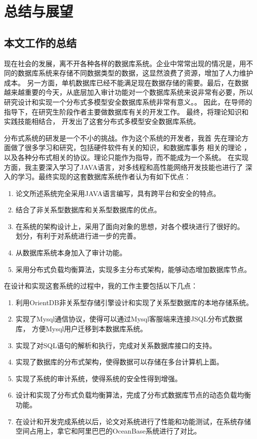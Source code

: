 \chapter{总结与展望}
\section{本文工作的总结}
现在社会的发展，离不开各种各样的数据库系统。企业中常常出现的情况是，用不同的数据库系统来存储不同数据类型的数据，这显然浪费了资源，增加了人力维护成本。
另一方面，单机数据库已经不能满足现在数据存储的需要。最后，在数据越来越重要的今天，从底层加入审计功能对一个数据库系统来说非常有必要，所以研究设计和实现一个分布式多模型安全数据库系统非常有意义。。
因此，在导师的
指导下，在研究生阶段作者主要做数据库有关的开发工作。
最终，将理论知识和实践技能相结合，
开发出了这套分布式多模型安全数据库系统。

分布式系统的研发是一个不小的挑战。作为这个系统的开发者，我首
先在理论方面做了很多学习和研究，包括硬件软件有关的知识，和数据库事务
相关的理论
，以及各种分布式相关的协议。理论只能作为指导，而不能成为一个系统。
在实现方面，我主要深入学习了JAVA语言，对多线程和高性能网络开发技能也进行了
深入的学习。最终实现的这套数据库系统作者认为有如下优点：
\begin{enumerate}[fullwidth,itemindent=2em]
	\item 论文所述系统完全采用JAVA语言编写，具有跨平台和安全的特点。
	\item 结合了非关系型数据库和关系型数据库的优点。
	\item 在系统的架构设计上，采用了面向对象的思想，对各个模块进行了很好的。
	划分，有利于对系统进行进一步的完善。
	\item 从数据库系统本身加入了审计功能。
	\item 采用分布式负载均衡算法，实现多主分布式架构，能够动态增加数据库节点。
\end{enumerate}

在设计和实现这套系统的过程中，我的工作主要包括以下几点：

\begin{enumerate}[fullwidth,itemindent=2em]
	\item 利用OrientDB非关系型存储引擎设计和实现了关系型数据库的本地存储系统。
	\item 实现了Mysql通信协议，使得可以通过Mysql客服端来连接JSQL分布式数据库，
	方便Mysql用户迁移到本数据库系统。
	\item 实现了对SQL语句的解析和执行，完成对关系数据库接口的支持。
	\item 实现了数据库的分布式架构，使得数据可以存储在多台计算机上面。
	\item 实现了系统的审计系统，使得系统的安全性得到增强。
	\item 设计和实现了分布式负载均衡算法，完成了分布式数据库节点的动态负载均衡功能。
	\item   在设计和开发完成系统以后，论文对系统进行了性能和功能测试，在系统存储空间占用上，拿它和阿里巴巴的OceanBase系统进行了对比。
\end{enumerate}
